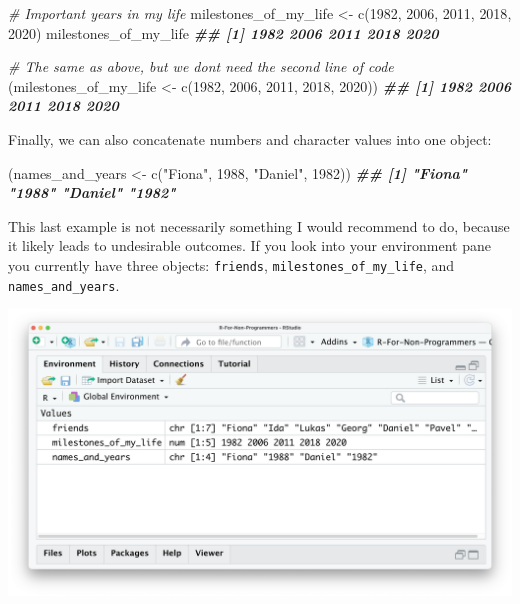 \documentclass[
]{book}
\newenvironment{Shaded}{\begin{snugshade}}{\end{snugshade}}
\newcommand{\CommentTok}[1]{\textcolor[rgb]{0.56,0.35,0.01}{\textit{#1}}}
\newcommand{\DecValTok}[1]{\textcolor[rgb]{0.00,0.00,0.81}{#1}}
\newcommand{\DocumentationTok}[1]{\textcolor[rgb]{0.56,0.35,0.01}{\textbf{\textit{#1}}}}
\newcommand{\FunctionTok}[1]{\textcolor[rgb]{0.00,0.00,0.00}{#1}}
\newcommand{\NormalTok}[1]{#1}
\newcommand{\OtherTok}[1]{\textcolor[rgb]{0.56,0.35,0.01}{#1}}
\newcommand{\StringTok}[1]{\textcolor[rgb]{0.31,0.60,0.02}{#1}}
\begin{document}
\begin{Shaded}
\begin{Highlighting}[]
\CommentTok{\# Important years in my life}
\NormalTok{milestones\_of\_my\_life }\OtherTok{\textless{}{-}} \FunctionTok{c}\NormalTok{(}\DecValTok{1982}\NormalTok{, }\DecValTok{2006}\NormalTok{, }\DecValTok{2011}\NormalTok{, }\DecValTok{2018}\NormalTok{, }\DecValTok{2020}\NormalTok{)}
\NormalTok{milestones\_of\_my\_life}
\DocumentationTok{\#\# [1] 1982 2006 2011 2018 2020}

\CommentTok{\# The same as above, but we don\textquotesingle{}t need the second line of code}
\NormalTok{(milestones\_of\_my\_life }\OtherTok{\textless{}{-}} \FunctionTok{c}\NormalTok{(}\DecValTok{1982}\NormalTok{, }\DecValTok{2006}\NormalTok{, }\DecValTok{2011}\NormalTok{, }\DecValTok{2018}\NormalTok{, }\DecValTok{2020}\NormalTok{))}
\DocumentationTok{\#\# [1] 1982 2006 2011 2018 2020}
\end{Highlighting}
\end{Shaded}

Finally, we can also concatenate numbers and character values into one object:

\begin{Shaded}
\begin{Highlighting}[]
\NormalTok{(names\_and\_years }\OtherTok{\textless{}{-}} \FunctionTok{c}\NormalTok{(}\StringTok{"Fiona"}\NormalTok{, }\DecValTok{1988}\NormalTok{, }\StringTok{"Daniel"}\NormalTok{, }\DecValTok{1982}\NormalTok{))}
\DocumentationTok{\#\# [1] "Fiona"  "1988"   "Daniel" "1982"}
\end{Highlighting}
\end{Shaded}

This last example is not necessarily something I would recommend to do, because it likely leads to undesirable outcomes. If you look into your environment pane you currently have three objects: \texttt{friends}, \texttt{milestones\_of\_my\_life}, and \texttt{names\_and\_years}.

\includegraphics{images/chapter_05_img/01_basic_computation_environment_objects.png}
\end{document}
